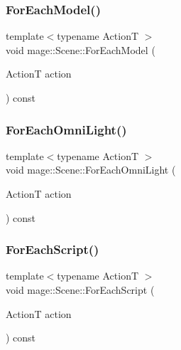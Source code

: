 \hypertarget{classmage_1_1_scene_a6327548021f874f22a1adc81cfc8a1ea}{}\label{classmage_1_1_scene_a6327548021f874f22a1adc81cfc8a1ea} 
\subsubsection{\texorpdfstring{For\+Each\+Model()}{ForEachModel()}}
{\footnotesize\ttfamily template$<$typename ActionT $>$ \\
void mage\+::\+Scene\+::\+For\+Each\+Model (\begin{DoxyParamCaption}\item[{ActionT}]{action }\end{DoxyParamCaption}) const\hspace{0.3cm}{\ttfamily [private]}}

\hypertarget{classmage_1_1_scene_acd71cef84ec39e63852d5918c7b17863}{}\label{classmage_1_1_scene_acd71cef84ec39e63852d5918c7b17863} 
\subsubsection{\texorpdfstring{For\+Each\+Omni\+Light()}{ForEachOmniLight()}}
{\footnotesize\ttfamily template$<$typename ActionT $>$ \\
void mage\+::\+Scene\+::\+For\+Each\+Omni\+Light (\begin{DoxyParamCaption}\item[{ActionT}]{action }\end{DoxyParamCaption}) const\hspace{0.3cm}{\ttfamily [private]}}

\hypertarget{classmage_1_1_scene_a4d16d973adce12868b9a0df9d92ef6d6}{}\label{classmage_1_1_scene_a4d16d973adce12868b9a0df9d92ef6d6} 
\subsubsection{\texorpdfstring{For\+Each\+Script()}{ForEachScript()}}
{\footnotesize\ttfamily template$<$typename ActionT $>$ \\
void mage\+::\+Scene\+::\+For\+Each\+Script (\begin{DoxyParamCaption}\item[{ActionT}]{action }\end{DoxyParamCaption}) const}

